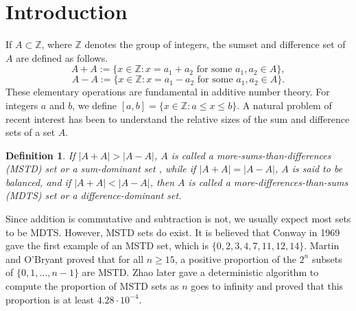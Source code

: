 \documentclass[11pt,reqno]{amsart}
\numberwithin{equation}{section}
\newtheorem{definition}[theorem]{Definition}
\begin{document}
\section{Introduction}
 If $A\subset \mathbb{Z}$, where $\mathbb{Z}$ denotes the group of integers,
 the sumset and difference set of $A$ are defined as follows.
 $$A+A:=\{x\in \mathbb{Z}: x=a_1+a_2  \text{ for some }  a_1,a_2 \in A\},$$
 $$A-A:=\{x\in \mathbb{Z}: x=a_1-a_2 \text{ for some } a_1,a_2 \in A\}.$$
 These elementary operations are fundamental in additive number theory. For integers $a$ and $b$, we define $[a,b] = \{x\in \mathbb{Z}: a\leq x \leq b\}$. A natural problem of
recent interest has been to understand the relative sizes of the sum and difference sets of a set  $A$.
\begin{definition}
If $|A+A| > |A-A|$, $A$ is called a  {\emph{more-sums-than-differences (MSTD)}} set or a {\emph{sum-dominant}}  set , while if $|A+A| = |A-A| $,  $A$ is said to be   {\emph{balanced}}, and if
$|A+A| < |A-A|$, then $A$ is called a {\emph{more-differences-than-sums (MDTS)}}
set or a  {\emph{difference-dominant}} set.
\end{definition}
Since addition is commutative and subtraction is not, we usually expect most sets to be MDTS. However, MSTD sets do exist. It is believed that Conway in 1969  gave the first example of an MSTD set, which is $\{0, 2, 3, 4, 7, 11, 12, 14\}$.  Martin and  O'Bryant \cite{Martin_Bryant_2006} proved that for all $n\geq 15$, a positive proportion of the $2^{n}$ subsets of $\{0, 1, \ldots, n-1\}$ are MSTD. Zhao \cite{Zhao_2011} later gave a deterministic algorithm to compute the proportion of MSTD
sets as $n$ goes to infinity and proved that this proportion is at least $4.28\cdot10^{-4}$. 
\end{document}

